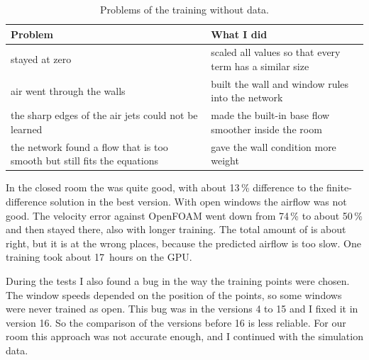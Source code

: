 \begin{table}[h]
  \centering
  \caption{Problems of the training without data.}
  \label{tab:pinnfix}
  \begin{tabular}{>{\raggedright}p{6.5cm}p{7.2cm}}
    \toprule
    Problem & What I did\\
    \midrule
    \cotwo{} stayed at zero & scaled all values so that every term has a similar size\\
    air went through the walls & built the wall and window rules into the network\\
    the sharp edges of the air jets could not be learned & made the built-in base flow smoother inside the room\\
    the network found a flow that is too smooth but still fits the equations & gave the wall condition more weight\\
    \bottomrule
  \end{tabular}
\end{table}

In the closed room the \cotwo{} was quite good, with about 13\,\% difference to the finite-difference solution
in the best version. With open windows the airflow was not good. The velocity error against OpenFOAM went
down from 74\,\% to about 50\,\% and then stayed there, also with longer training. The total amount of
\cotwo{} is about right, but it is at the wrong places, because the predicted airflow is too slow. One
training took about 17~hours on the GPU.

During the tests I also found a bug in the way the training points were chosen. The window speeds depended on
the position of the points, so some windows were never trained as open. This bug was in the versions 4 to 15
and I fixed it in version 16. So the comparison of the versions before 16 is less reliable. For our room this
approach was not accurate enough, and I continued with the simulation data.
